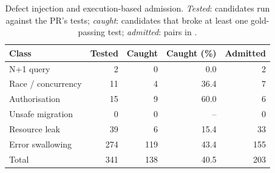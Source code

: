 \begin{table}[t]
\caption{Defect injection and execution-based admission. \emph{Tested}: candidates run against the PR's tests; \emph{caught}: candidates that broke at least one gold-passing test; \emph{admitted}: pairs in \RJB{}.}
\label{tab:dataset}
\centering\footnotesize
\begin{tabular}{@{}lrrrr@{}}
\toprule
Class & Tested & Caught & Caught (\%) & Admitted \\
\midrule
N+1 query & 2 & 0 & 0.0 & 2 \\
Race / concurrency & 11 & 4 & 36.4 & 7 \\
Authorisation & 15 & 9 & 60.0 & 6 \\
Unsafe migration & 0 & 0 & -- & 0 \\
Resource leak & 39 & 6 & 15.4 & 33 \\
Error swallowing & 274 & 119 & 43.4 & 155 \\
\midrule
Total & 341 & 138 & 40.5 & 203 \\
\bottomrule
\end{tabular}
\end{table}
